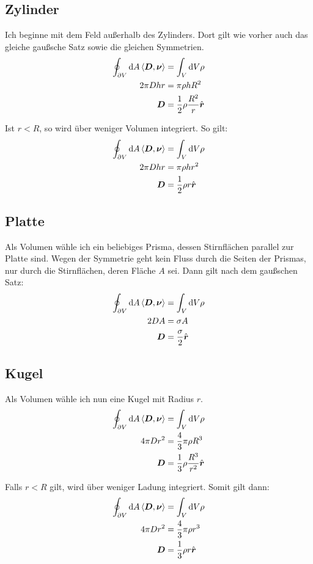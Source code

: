 \documentclass[11pt, ngerman]{article}
\newcommand{\inner}[2]{\left\langle #1, #2 \right\rangle}
\renewcommand{\vec}[1]{\boldsymbol{#1}}
\begin{document}
\subsection{Zylinder}

Ich beginne mit dem Feld außerhalb des Zylinders. Dort gilt wie vorher auch das gleiche gaußsche Satz sowie die gleichen Symmetrien.
%
\begin{align*}
	\oint_{\partial V} \dif A \inner{\vec D}{\vec \nu} &= \int_V \dif V \rho \\
				  2 \pi D h r &= \pi \rho h R^2 \\
									  \vec D &= \frac 12 \rho \frac {R^2}r \hat{\vec r}
\end{align*}

Ist $r < R$, so wird über weniger Volumen integriert. So gilt:
\begin{align*}
	\oint_{\partial V} \dif A \inner{\vec D}{\vec \nu} &= \int_V \dif V \rho \\
				  2 \pi D h r &= \pi \rho h r^2 \\
									  \vec D &= \frac 12 \rho r \hat{\vec r}
\end{align*}

\subsection{Platte}

Als Volumen wähle ich ein beliebiges Prisma, dessen Stirnflächen parallel zur
Platte sind. Wegen der Symmetrie geht kein Fluss durch die Seiten der Prismas,
nur durch die Stirnflächen, deren Fläche $A$ sei. Dann gilt nach dem gaußschen Satz:
%
\begin{align*}
	\oint_{\partial V} \dif A \inner{\vec D}{\vec \nu} &= \int_V \dif V \rho \\
	2 D A &= \sigma A \\
   \vec D &= \frac{\sigma}2 \hat{\vec r}
\end{align*}

\subsection{Kugel}

Als Volumen wähle ich nun eine Kugel mit Radius $r$.
%
\begin{align*}
	\oint_{\partial V} \dif A \inner{\vec D}{\vec \nu} &= \int_V \dif V \rho \\
	4 \pi D r^2 &= \frac 43 \pi \rho R^3 \\
						\vec D &= \frac 13 \rho \frac{R^3}{r^2} \hat{\vec r}
\end{align*}

Falls $r < R$ gilt, wird über weniger Ladung integriert. Somit gilt dann:
%
\begin{align*}
	\oint_{\partial V} \dif A \inner{\vec D}{\vec \nu} &= \int_V \dif V \rho \\
	4 \pi D r^2 &= \frac 43 \pi \rho r^3 \\
						\vec D &= \frac 13 \rho r \hat{\vec r}
\end{align*}
\end{document}
